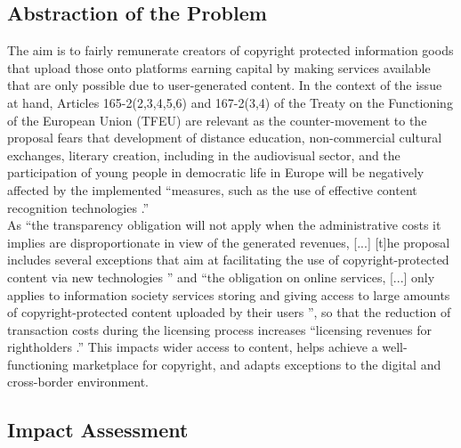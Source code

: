 \documentclass[a4paper]{article}
\begin{document}
\subsection{Abstraction of the Problem}

The aim is to fairly remunerate creators of copyright protected information goods that upload those onto platforms earning capital by making services available that are only possible due to user-generated content. In the context of the issue at hand, Articles 165-2(2,3,4,5,6) and 167-2(3,4) of the Treaty on the Functioning of the European Union (TFEU) are relevant as the counter-movement to the proposal fears that development of distance education, non-commercial cultural exchanges, literary creation, including in the audiovisual sector, and the participation of young people in democratic life in Europe will be negatively affected by the implemented ``measures, such as the use of effective content recognition technologies \cite{Copyright Reform}.'' \\

\noindent
As ``the transparency obligation will not apply when the administrative costs it implies are disproportionate in view of the generated revenues, [...] [t]he proposal includes several exceptions that aim at facilitating the use of copyright-protected content via new technologies \cite{Copyright Reform}'' and ``the obligation on online services, [...] only applies to information society services storing and giving access to large amounts of copyright-protected content uploaded by their users \cite{Copyright Reform}'', so that the reduction of transaction costs during the licensing process increases ``licensing revenues for rightholders \cite{Copyright Reform}.'' This impacts wider access to content, helps achieve a well-functioning marketplace for copyright, and adapts exceptions to the digital and cross-border environment. 

\newpage
\subsection{Impact Assessment}
\end{document}
